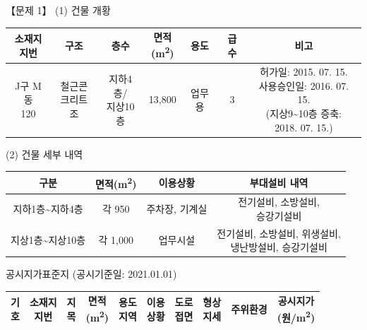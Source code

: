 \begin{longquestion}{【문제 1】}
(1) 건물 개황 \par
{\small\centering
\begin{tabular}{|c|c|c|c|c|c|c|}\hline
\makecell{소재지\\지번} & 구조 & 층수 & \makecell{면적\\(m\textsuperscript{2})} & 용도 & 급수 & 비고 \\\hline
\makecell{J구 M동\\120} & \makecell{철근콘\\크리트조} & \makecell{지하4층/\\지상10층} & 13,800 & 업무용 & 3 & \makecell{허가일: 2015. 07. 15.\\사용승인일: 2016. 07. 15.\\(지상9\textasciitilde{}10층 증축:\\2018. 07. 15.)} \\\hline
\end{tabular}\par}
(2) 건물 세부 내역 \par
{\small\centering
\begin{tabular}{|c|c|c|c|}\hline
구분 & 면적(m\textsuperscript{2}) & 이용상황 & 부대설비 내역 \\\hline
지하1층\textasciitilde{}지하4층 & 각 950 & 주차장, 기계실 & \makecell{전기설비, 소방설비,\\승강기설비} \\\hline
지상1층\textasciitilde{}지상10층 & 각 1,000 & 업무시설 & \makecell{전기설비, 소방설비, 위생설비,\\냉난방설비, 승강기설비} \\\hline
\end{tabular}\par}
\medskip{} 공시지가표준지 \hfill (공시기준일: 2021.01.01) \par
{\small\centering
\begin{tabular}{|c|c|c|c|c|c|c|c|c|c|}\hline
\makecell{기\\호} & \makecell{소재지\\지번} & \makecell{지\\목} & \makecell{면적\\(m\textsuperscript{2})} & \makecell{용도\\지역} & \makecell{이용\\상황} & \makecell{도로\\접면} & \makecell{형상\\지세} & 주위환경 & \makecell{공시지가\\(원/m\textsuperscript{2})} \\\hline

\end{tabular}}
\end{longquestion}
